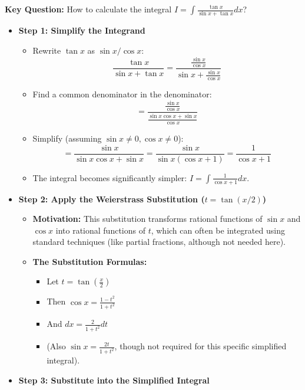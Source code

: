 \begin{cascade}
	\textbf{Key Question:} How to calculate the integral $I = \int \frac{\tan x}{\sin x + \tan x} dx$?
	\begin{itemize}
		\item \textbf{Step 1: Simplify the Integrand}
		      \begin{itemize}
			      \item Rewrite $\tan x$ as $\sin x / \cos x$:
			            \[ \frac{\tan x}{\sin x + \tan x} = \frac{\frac{\sin x}{\cos x}}{\sin x + \frac{\sin x}{\cos x}} \]
			      \item Find a common denominator in the denominator:
			            \[ = \frac{\frac{\sin x}{\cos x}}{\frac{\sin x \cos x + \sin x}{\cos x}} \]
			      \item Simplify (assuming $\sin x \neq 0, \cos x \neq 0$):
			            \[ = \frac{\sin x}{\sin x \cos x + \sin x} = \frac{\sin x}{\sin x (\cos x + 1)} = \frac{1}{\cos x + 1} \]
			      \item The integral becomes significantly simpler: $I = \int \frac{1}{\cos x + 1} dx$.
		      \end{itemize}
		\item \textbf{Step 2: Apply the Weierstrass Substitution ($t = \tan(x/2)$)}
		      \begin{itemize}
			      \item \textbf{Motivation:} This substitution transforms rational functions of $\sin x$ and $\cos x$ into rational functions of $t$, which can often be integrated using standard techniques (like partial fractions, although not needed here).
			      \item \textbf{The Substitution Formulas:}
			            \begin{itemize}
				            \item Let $\boxed{t = \tan\left(\frac{x}{2}\right)}$
				            \item Then $\cos x = \frac{1-t^2}{1+t^2}$
				            \item And $dx = \frac{2}{1+t^2} dt$
				            \item (Also $\sin x = \frac{2t}{1+t^2}$, though not required for this specific simplified integral).
			            \end{itemize}
		      \end{itemize}
		\item \textbf{Step 3: Substitute into the Simplified Integral}
		      \begin{itemize}

\end{itemize}
\end{itemize}
\end{cascade}
